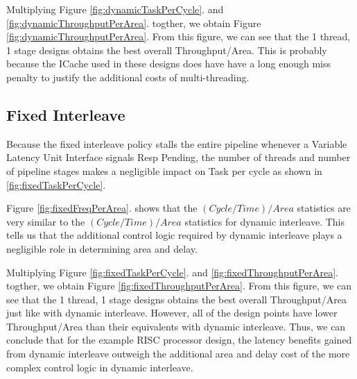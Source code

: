 Multiplying Figure \ref{fig:dynamicTaskPerCycle}. and \ref{fig:dynamicThroughputPerArea}. togther, we obtain Figure \ref{fig:dynamicThroughputPerArea}. From this figure, we can see that the 1 thread, 1 stage designs obtains the best overall Throughput/Area. This is probably because the ICache used in these designs does have have a long enough miss penalty to justify the additional costs of multi-threading.

\subsection{Fixed Interleave}
Because the fixed interleave policy stalls the entire pipeline whenever a Variable Latency Unit Interface signals Resp Pending, the number of threads and number of pipeline stages makes a negligible impact on Task per cycle as shown in \ref{fig:fixedTaskPerCycle}.

Figure \ref{fig:fixedFreqPerArea}. shows that the $(Cycle/Time)/Area$ statistics are very similar to the $(Cycle/Time)/Area$ statistics for dynamic interleave. This tells us that the additional control logic required by dynamic interleave plays a negligible role in determining area and delay.

Multiplying Figure \ref{fig:fixedTaskPerCycle}. and \ref{fig:fixedThroughputPerArea}. togther, we obtain Figure \ref{fig:fixedThroughputPerArea}. From this figure, we can see that the 1 thread, 1 stage designs obtains the best overall Throughput/Area just like with dynamic interleave. However, all of the design points have lower Throughput/Area than their equivalents with dynamic interleave. Thus, we can conclude that for the example RISC processor design, the latency benefits gained from dynamic interleave outweigh the additional area and delay cost of the more complex control logic in dynamic interleave.

